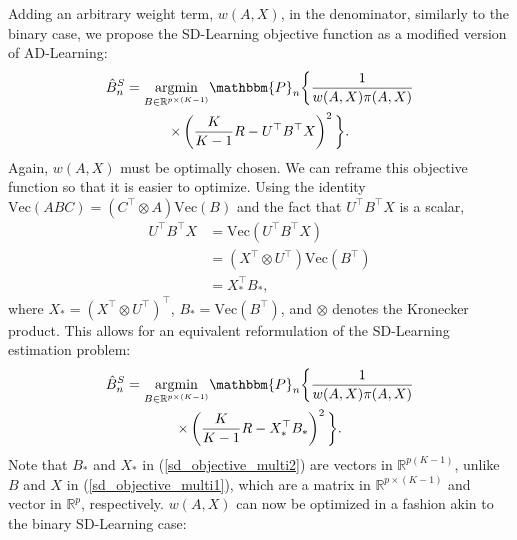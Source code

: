 \documentclass[useAMS,usenatbib]{biom}
\begin{document}
Adding an arbitrary weight term, $w(A,X)$, in the denominator, similarly to the binary case, we propose the SD-Learning objective function as a modified version of AD-Learning:
\begin{multline}
\label{sd_objective_multi1}
\hat{B}_n^S = \underset{B \in \mathbb{R}^{p \times (K-1)}}{\mathrm{argmin}} \mathbbm{P}_n \bigg\{ \frac{1}{w(A,X) \pi(A,X)} \\ \times \left( \frac{K}{K-1}R - U^{\top}B^{\top}X \right)^2 \bigg\}.
\end{multline}
Again, $w(A,X)$ must be optimally chosen. We can reframe this objective function so that it is easier to optimize. Using the identity $\mbox{Vec}\left( ABC \right) = \left( C^{\top} \otimes A \right) \mbox{Vec}(B)$ and the fact that $U^{\top}B^{\top}X$ is a scalar,
\begin{equation*}
\begin{split}
U^{\top}B^{\top}X &= \mbox{Vec} \left( U^{\top}B^{\top}X \right) \\
&= \left( X^{\top} \otimes U^{\top} \right) \mbox{Vec}\left( B^{\top} \right) \\
    &= X_*^{\top} B_*,
\end{split}
\end{equation*}
where $X_* = \left(X^{\top} \otimes U^{\top} \right)^{\top}$, $B_* = \mbox{Vec} \left( B^{\top} \right)$, and $\otimes$ denotes the Kronecker product. This allows for an equivalent reformulation of the SD-Learning estimation problem:
\begin{multline} \label{sd_objective_multi2}
\hat{B}_n^S = \underset{B \in \mathbb{R}^{p \times (K-1)}}{\mathrm{argmin}} \mathbbm{P}_n \bigg\{ \frac{1}{w(A,X) \pi(A,X)} \\ \times \left( \frac{K}{K-1}R - X_*^{\top} B_* \right)^2 \bigg\}.
\end{multline}
Note that $B_*$ and $X_*$ in (\ref{sd_objective_multi2}) are vectors in $\mathbb{R}^{p(K-1)}$, unlike $B$ and $X$ in (\ref{sd_objective_multi1}), which are a matrix in $\mathbb{R}^{p \times (K-1)}$ and vector in $\mathbb{R}^{p}$, respectively. $w(A,X)$ can now be optimized in a fashion akin to the binary SD-Learning case:
\end{document}
